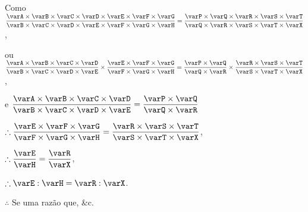 \documentclass[booklanguage=brazilian]{byrnebook}
\begin{document}
\begin{center}
Como $\dfrac
{\varA \times \varB \times \varC \times \varD \times \varE \times \varF \times \varG}
{\varB \times \varC \times \varD \times \varE \times \varF \times \varG \times \varH} =
\dfrac
{\varP \times \varQ \times \varR \times \varS \times \varT}
{\varQ \times \varR \times \varS \times \varT \times \varX}$,

ou $\dfrac
{\varA \times \varB \times \varC \times \varD}
{\varB \times \varC \times \varD \times \varE}
\times
\dfrac
{\varE \times \varF \times \varG}
{\varF \times \varG \times \varH} =
\dfrac
{\varP \times \varQ}
{\varQ \times \varR}
\times
\dfrac
{\varR \times \varS \times \varT}
{\varS \times \varT \times \varX}$,

e $\dfrac
{\varA \times \varB \times \varC \times \varD}
{\varB \times \varC \times \varD \times \varE} =
\dfrac
{\varP \times \varQ}
{\varQ \times \varR}$

$\therefore \dfrac
{\varE \times \varF \times \varG}
{\varF \times \varG \times \varH} =
\dfrac
{\varR \times \varS \times \varT}
{\varS \times \varT \times \varX}$,

$\therefore \dfrac{\varE}{\varH} = \dfrac{\varR}{\varX}$,

$\therefore \varE : \varH = \varR : \varX$.

$\therefore$ Se uma razão que, \&c.
\end{center}
\vfill\pagebreak
\end{document}
